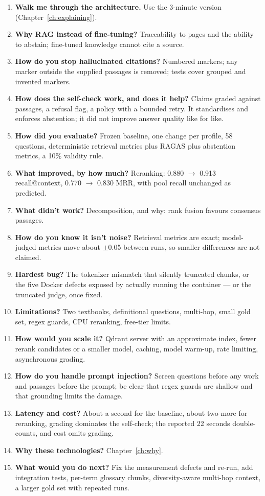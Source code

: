 \begin{enumerate}
  \item \textbf{Walk me through the architecture.} Use the 3-minute version (Chapter~\ref{ch:explaining}).
  \item \textbf{Why RAG instead of fine-tuning?} Traceability to pages and the ability to abstain; fine-tuned knowledge cannot cite a source.
  \item \textbf{How do you stop hallucinated citations?} Numbered markers; any marker outside the supplied passages is removed; tests cover grouped and invented markers.
  \item \textbf{How does the self-check work, and does it help?} Claims graded against passages, a refusal flag, a policy with a bounded retry. It standardises and enforces abstention; it did not improve answer quality like for like.
  \item \textbf{How did you evaluate?} Frozen baseline, one change per profile, 58 questions, deterministic retrieval metrics plus RAGAS plus abstention metrics, a 10\% validity rule.
  \item \textbf{What improved, by how much?} Reranking: 0.880 $\rightarrow$ 0.913 recall@context, 0.770 $\rightarrow$ 0.830 MRR, with pool recall unchanged as predicted.
  \item \textbf{What didn't work?} Decomposition, and why: rank fusion favours consensus passages.
  \item \textbf{How do you know it isn't noise?} Retrieval metrics are exact; model-judged metrics move about $\pm$0.05 between runs, so smaller differences are not claimed.
  \item \textbf{Hardest bug?} The tokenizer mismatch that silently truncated chunks, or the five Docker defects exposed by actually running the container --- or the truncated judge, once fixed.
  \item \textbf{Limitations?} Two textbooks, definitional questions, multi-hop, small gold set, regex guards, CPU reranking, free-tier limits.
  \item \textbf{How would you scale it?} Qdrant server with an approximate index, fewer rerank candidates or a smaller model, caching, model warm-up, rate limiting, asynchronous grading.
  \item \textbf{How do you handle prompt injection?} Screen questions before any work and passages before the prompt; be clear that regex guards are shallow and that grounding limits the damage.
  \item \textbf{Latency and cost?} About a second for the baseline, about two more for reranking, grading dominates the self-check; the reported 22 seconds double-counts, and cost omits grading.
  \item \textbf{Why these technologies?} Chapter~\ref{ch:why}.
  \item \textbf{What would you do next?} Fix the measurement defects and re-run, add integration tests, per-term glossary chunks, diversity-aware multi-hop context, a larger gold set with repeated runs.
\end{enumerate}

